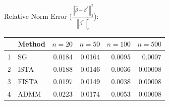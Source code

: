 \documentclass[xcolor=dvipsnames,aspectratio=1610]{beamer}
\newcommand{\norm}[1]{\left|\left|#1\right|\right|}
\theoremstyle{remark}
\begin{document}
\begin{frame}{Relative Norm Error ($\frac{\norm{\hat{\beta}-\beta^*}_2^2}{\norm{\beta^*}_2^2}$):}
\begin{table}[ht]
\centering
\begin{tabular}{rlrrrr}
  \hline
 & Method & $n=20$ & $n=50$ & $n=100$ & $n=500$ \\ 
  \hline
1 & SG & 0.0184 & 0.0164 & 0.0095 & 0.0007\\ 
  2 & ISTA& 0.0188 & 0.0146 & 0.0036 & 0.00008\\ 
  3 & FISTA & 0.0197 & 0.0149 & 0.0038 & 0.00008\\ 
  4 & ADMM & 0.0223 & 0.0174 & 0.0053 & 0.00008\\ 
   \hline
\end{tabular}
\label{tab:relnorm}
\end{table}
\end{frame}
\end{document}
